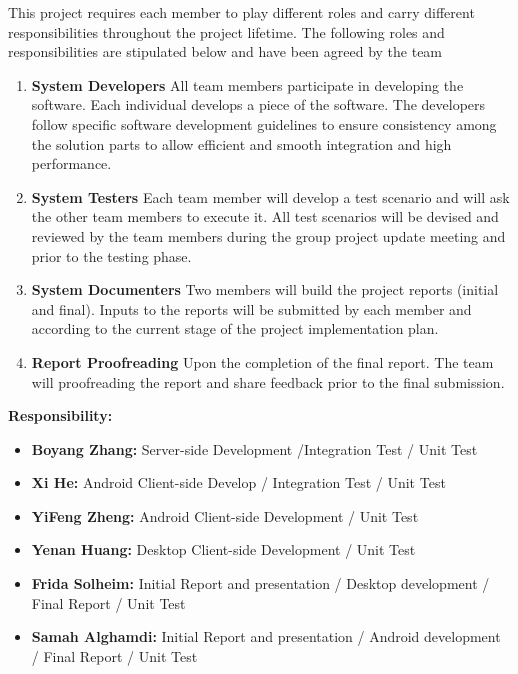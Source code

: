 \documentclass{article}
\begin{document}
This project requires each member to play different roles and carry different responsibilities throughout the project lifetime. The following roles and responsibilities are stipulated below and have been agreed by the team

\begin{enumerate}

  \item \textbf{System Developers} All team members participate in developing the software. Each individual develops a piece of the software. The developers follow specific software development guidelines to ensure consistency among the solution parts to allow efficient and smooth integration and high performance.
  \item \textbf{System Testers} Each team member will develop a test scenario and will ask the other team members to execute it. All test scenarios will be devised and reviewed by the team members during the group project update meeting and prior to the testing phase.
  \item \textbf{System Documenters} Two members will build the project reports (initial and final). Inputs to the reports will be submitted by each member and according to the current stage of the project implementation plan.
  \item \textbf{Report Proofreading} Upon the completion of the final report. The team will proofreading the report and share feedback prior to the final submission.

\end{enumerate}

\textbf{Responsibility:}

\begin{itemize}
  \item \textbf{Boyang Zhang:} Server-side Development /Integration Test / Unit Test
  \item \textbf{Xi He:} Android Client-side Develop / Integration Test / Unit Test
  \item \textbf{YiFeng Zheng:} Android Client-side Development / Unit Test
  \item \textbf{Yenan Huang:} Desktop Client-side Development / Unit Test
  \item \textbf{Frida Solheim:} Initial Report and presentation / Desktop development / Final Report / Unit Test
  \item \textbf{Samah Alghamdi:} Initial Report and presentation / Android development / Final Report / Unit Test
\end{itemize}
\end{document}
